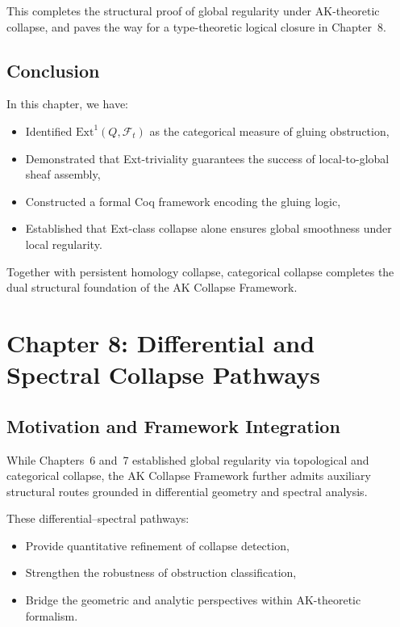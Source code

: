 \documentclass[11pt]{article}
\begin{document}
This completes the structural proof of global regularity under AK-theoretic collapse, and paves the way for a type-theoretic logical closure in Chapter~8.

\subsection{Conclusion}

In this chapter, we have:
\begin{itemize}
  \item Identified \( \mathrm{Ext}^1(Q, \mathcal{F}_t) \) as the categorical measure of gluing obstruction,
  \item Demonstrated that Ext-triviality guarantees the success of local-to-global sheaf assembly,
  \item Constructed a formal Coq framework encoding the gluing logic,
  \item Established that Ext-class collapse alone ensures global smoothness under local regularity.
\end{itemize}

Together with persistent homology collapse, categorical collapse completes the dual structural foundation of the AK Collapse Framework.



\section{Chapter 8: Differential and Spectral Collapse Pathways}
\label{sec:differential-spectral-collapse}

\subsection{Motivation and Framework Integration}

While Chapters~6 and~7 established global regularity via topological and categorical collapse, the AK Collapse Framework further admits auxiliary structural routes grounded in differential geometry and spectral analysis.

These differential–spectral pathways:
\begin{itemize}
  \item Provide quantitative refinement of collapse detection,
  \item Strengthen the robustness of obstruction classification,
  \item Bridge the geometric and analytic perspectives within AK-theoretic formalism.
\end{itemize}
\end{document}

